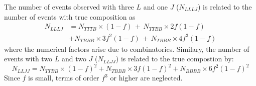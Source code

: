 
The number of events observed with three $L$ and one $J$ ($N_{LLLJ}$) is related to
the number of events with true composition as
\begin{align}
N_{LLLJ} &= N_{TTTB} \times (1-f)\, +\, N_{TTBB} \times 2f(1-f) \\
         &+ N_{TBBB} \times 3f^{2}(1-f)\, +\,  N_{TBBB} \times 4f^{3}(1-f) 
\end{align}
where the numerical factors arise due to combinatorics. Similary, the number of events with two $L$ and two $J$ ($N_{LLJJ}$) is related to the
true compostion by:
\begin{equation}
N_{LLJJ} = N_{TTBB} \times (1-f)^{2} + N_{TBBB} \times 3 f(1-f)^{2}  + N_{BBBB}
\times 6 f^{2}(1-f)^{2}
\end{equation}
Since $f$ is small,
terms of order $f^{3}$ or higher are neglected.

